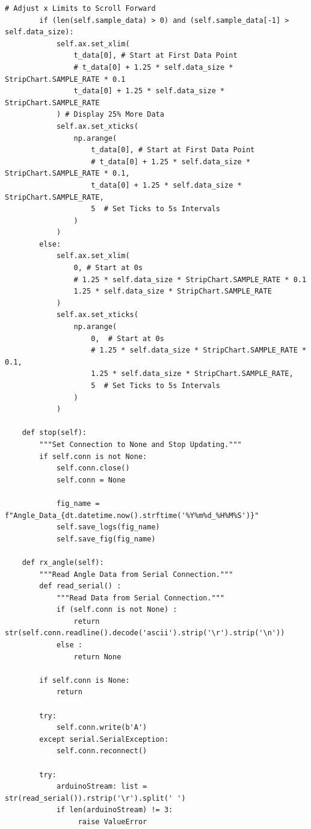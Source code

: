 \documentclass{article}
\begin{document}
\begin{lstlisting}[caption={Source Code : Python Stripchart}, label={lst:stripchart_code}]
        # Adjust x Limits to Scroll Forward
        if (len(self.sample_data) > 0) and (self.sample_data[-1] > self.data_size):
            self.ax.set_xlim(
                t_data[0], # Start at First Data Point
                # t_data[0] + 1.25 * self.data_size * StripChart.SAMPLE_RATE * 0.1
                t_data[0] + 1.25 * self.data_size * StripChart.SAMPLE_RATE
            ) # Display 25% More Data
            self.ax.set_xticks(
                np.arange(
                    t_data[0], # Start at First Data Point
                    # t_data[0] + 1.25 * self.data_size * StripChart.SAMPLE_RATE * 0.1,
                    t_data[0] + 1.25 * self.data_size * StripChart.SAMPLE_RATE,
                    5  # Set Ticks to 5s Intervals
                )
            )
        else:
            self.ax.set_xlim(
                0, # Start at 0s
                # 1.25 * self.data_size * StripChart.SAMPLE_RATE * 0.1
                1.25 * self.data_size * StripChart.SAMPLE_RATE
            )
            self.ax.set_xticks(
                np.arange(
                    0,  # Start at 0s
                    # 1.25 * self.data_size * StripChart.SAMPLE_RATE * 0.1,
                    1.25 * self.data_size * StripChart.SAMPLE_RATE,
                    5  # Set Ticks to 5s Intervals
                )
            )

    def stop(self):
        """Set Connection to None and Stop Updating."""
        if self.conn is not None:
            self.conn.close()
            self.conn = None

            fig_name = f"Angle_Data_{dt.datetime.now().strftime('%Y%m%d_%H%M%S')}"
            self.save_logs(fig_name)
            self.save_fig(fig_name)

    def rx_angle(self):
        """Read Angle Data from Serial Connection."""
        def read_serial() :
            """Read Data from Serial Connection."""
            if (self.conn is not None) :
                return str(self.conn.readline().decode('ascii').strip('\r').strip('\n'))
            else :
                return None

        if self.conn is None:
            return

        try:
            self.conn.write(b'A')
        except serial.SerialException:
            self.conn.reconnect()

        try:
            arduinoStream: list = str(read_serial()).rstrip('\r').split(' ')
            if len(arduinoStream) != 3:
                 raise ValueError


\end{lstlisting}
\end{document}
